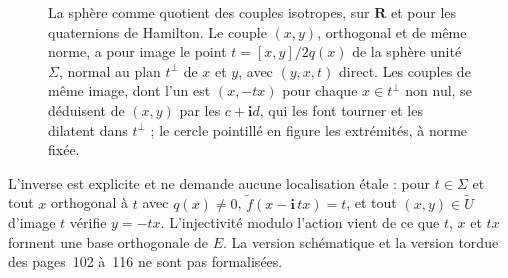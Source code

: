\begin{figure}[htbp]
\centering
{}
\caption{La sphère comme quotient des couples isotropes, sur $\mathbf R$ et pour les quaternions de Hamilton. Le couple $(x, y)$, orthogonal et de même norme, a pour image le point $t = [x, y]/2q(x)$ de la sphère unité $\Sigma$, normal au plan $t^\perp$ de $x$ et $y$, avec $(y, x, t)$ direct. Les couples de même image, dont l'un est $(x, -tx)$ pour chaque $x \in t^\perp$ non nul, se déduisent de $(x, y)$ par les $c + \mathbf i d$, qui les font tourner et les dilatent dans $t^\perp$ ; le cercle pointillé en figure les extrémités, à norme fixée.}
\label{fig:77-sphere}
\end{figure}

\begin{remarque}
L'inverse est explicite et ne demande aucune localisation étale : pour $t \in \Sigma$ et tout $x$ orthogonal à $t$ avec $q(x) \neq 0$, $\tilde f(x - \mathbf i\,tx) = t$, et tout $(x, y) \in \tilde U$ d'image $t$ vérifie $y = -tx$. L'injectivité modulo l'action vient de ce que $t$, $x$ et $tx$ forment une base orthogonale de $E$. La version schématique et la version tordue des pages~102 à~116 ne sont pas formalisées.
\end{remarque}

